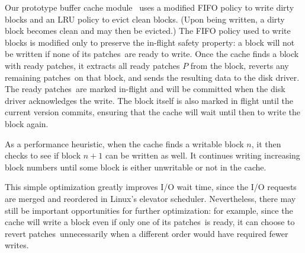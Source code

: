 \documentclass[9pt,twocolumn,letterpaper]{article}
\newcommand{\Kudos}{Featherstitch}
\newcommand{\patch}{patch}
\newcommand{\patches}{patches}
\newcommand{\module}{module}
\newcommand{\modules}{modules}
\begin{document}
Our prototype buffer cache \module\ 
%
uses a modified FIFO policy to write dirty blocks and an LRU policy to
evict clean blocks.  (Upon being written, a dirty block becomes clean and
may then be evicted.)
%
The FIFO policy used to write blocks is modified only to preserve the
in-flight safety property: a block will not be written if none of its
\patches\ are ready to write.
%
Once the cache finds a block with ready \patches, it extracts all ready
patches $P$ from the block, reverts any remaining \patches\ on that block,
and sends the resulting data to the disk driver.  The ready \patches\ are
marked in-flight and will be committed when the disk driver acknowledges
the write.
%
The block itself is also marked in flight until the current version
commits, ensuring that the cache will wait until then to write the block
again.


As a performance heuristic, when the cache finds a writable block $n$, it
then checks to see if block $n+1$ can be written as
well.
%
It continues writing increasing block numbers until some block is either
unwritable or not in the cache.
%
\begin{comment}
The block itself is also marked \PInfst, so that only
one version of its data will be in flight at a time. (This whole procedure is
basically the buffer cache \textit{Write block} action.)
\end{comment}
%
This simple optimization greatly improves I/O wait time, since the I/O
requests are merged and reordered in Linux's elevator scheduler.
%
Nevertheless, there may still be important opportunities for further
optimization: for example, since the cache will write a block even if only
one of its \patches\ is ready, it can choose to revert \patches\
unnecessarily when a different order would have required fewer writes.


\begin{comment}
Each \patch\ on a cached block may or may not be visible to a given \module.
For example, \modules\ that respond to user requests generally view the most
current state of every block -- the block with all \patches\ applied. However, a
write-back cache may choose to write some \patches\ on a block while reverting
others, since those others currently have outstanding dependencies. In this
case, \modules\ below the write-back cache (i.e. closer to the disk) should view
those \patches\ in the reverted state. \Kudos\ provides a block revisioning
library function that automatically reverts those \patches\ that should not
be visible at a particular \module, and then re-applies them after that
\module\ is done with the block.
\end{comment}
\end{document}
